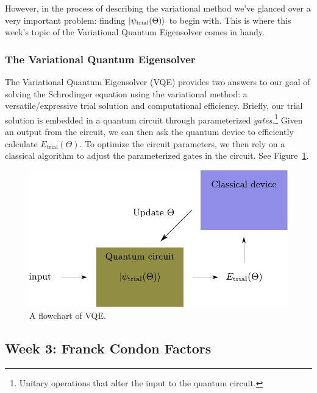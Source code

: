 \documentclass[12pt]{article}
\begin{document}
However, in the process of describing the variational method we've glanced over a very important problem: finding $\ket{\psi_{\text{trial}}(\Theta)}$ to begin with. This is where this week's topic of the Variational Quantum Eigensolver comes in handy.

\subsubsection{The Variational Quantum Eigensolver \cite{PeruzzoVQE}}

The Variational Quantum Eigensolver (VQE) provides two answers to our goal of solving the Schrodinger equation using the variational method: a versatile/expressive trial solution and computational efficiency.
Briefly, our trial solution is embedded in a quantum circuit through parameterized {\it gates}.\footnote{Unitary operations that alter the input to the quantum circuit.} Given an output from the circuit, we can then ask the quantum device to efficiently calculate $E_{\text{trial}}(\Theta)$. To optimize the circuit parameters, we then rely on a classical algorithm to adjust the parameterized gates in the circuit. See Figure~\ref{fig:vqe}.

\begin{figure} \label{fig:vqe}
    \begin{center}
        \includegraphics[width=0.7\linewidth]{figures/VQE_flowchart.pdf}
    \end{center}
    \caption{A flowchart of VQE.}
\end{figure}

\newpage

\subsection{Week 3: Franck Condon Factors}
\end{document}
